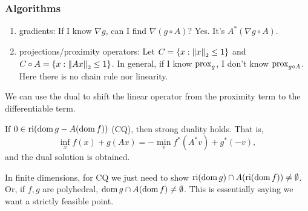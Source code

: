 \documentclass[class=article,crop=false]{standalone}
\begin{document}
\subsubsection{Algorithms}
\begin{enumerate}[label=(\arabic*)]
	\item gradients: If I know $ \nabla g$, can I find $ \nabla (g \circ A)$? Yes. It's $ A^* (\nabla g \circ A)$.
	\item projections/proximity operators: Let $ C = \{x: {\left\lVert{ x}\right\rVert}_2 \leq 1\} $ and $ C \circ A = \{x: {\left\lVert{ Ax}\right\rVert}_2 \leq 1\} $. In general, if I know $ \operatorname{prox}_{g}$, I don't know $ \operatorname{prox}_{g \circ A}$. Here there is no chain rule nor linearity.
\end{enumerate}
\begin{remark}
We can use the dual to shift the linear operator from the proximity term to the differentiable term.
\end{remark}

\begin{thm}
	If $ 0 \in \operatorname{ri} (\operatorname{dom} g - A(\operatorname{dom} f))$ (CQ), then strong duality holds. That is,
	\[
		\inf_x f(x) + g(Ax) = -\min_{v} f^* (A^* v) + g^* (-v)
	,\]
	and the dual solution is obtained.
\end{thm}
\begin{note}
	In finite dimensions, for CQ we just need to show $ \operatorname{ri}(\operatorname{dom} g) \cap A (\operatorname{ri} (\operatorname{dom} f))\neq \emptyset$. Or, if $ f,g$ are polyhedral,  $ \operatorname{dom} g \cap A(\operatorname{dom} f) \neq \emptyset$. This is essentially saying we want a strictly feasible point.
\end{note}
\end{document}
